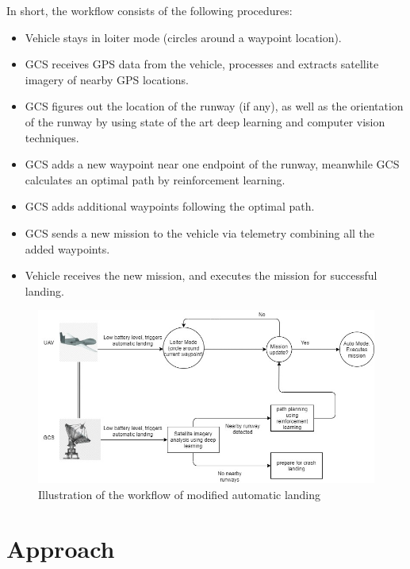 \documentclass[10pt,twocolumn,letterpaper]{article}
\begin{document}
In short, the workflow consists of the following procedures:
\begin{itemize}
  \item Vehicle stays in loiter mode (circles around a waypoint location). 
  \item GCS receives GPS data from the vehicle, processes and extracts satellite imagery of nearby GPS locations. 
  \item GCS figures out the location of the runway (if any), as well as the orientation of the runway by using state of the art deep learning and computer vision techniques.
  \item GCS adds a new waypoint near one endpoint of the runway, meanwhile GCS calculates an optimal path by reinforcement learning.
  \item GCS adds additional waypoints following the optimal path.
  \item GCS sends a new mission to the vehicle via telemetry combining all the added waypoints.
  \item Vehicle receives the new mission, and executes the mission for successful landing.
\end{itemize}
\begin{figure}[t]
\begin{center}
   \includegraphics[width=1.0\linewidth]{flow.jpg}
\end{center}
   \caption{Illustration of the workflow of modified automatic landing}
\label{fig:long}
\label{fig:onecol}
\end{figure}
\section{Approach}
\end{document}
